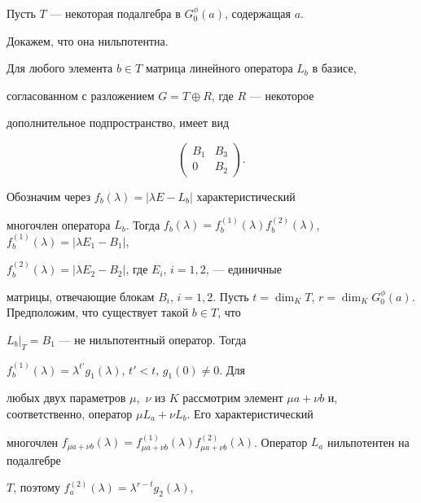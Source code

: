 \begin{pf} 


Пусть $T$ --- некоторая подалгебра в $G^\phi_0(a)$, содержащая $a$.  


Докажем, что она нильпотентна. 


 


Для любого элемента $b\in T$ матрица линейного оператора $L_b$ в базисе, 


согласованном с разложением $G=T\oplus R$, где $R$ --- некоторое 


дополнительное подпространство, имеет вид  


$$ 


\begin{pmatrix} 


B_1 & B_3 \\ 0 & B_2 


\end{pmatrix} 


. 


$$ 


 


Обозначим через $f_b(\lambda)=|\lambda E-L_b|$ характеристический 


многочлен оператора $L_b$. Тогда $f_b(\lambda)=f^{(1)}_b(\lambda) 


f^{(2)}_b(\lambda)$, $f^{(1)}_b(\lambda)=|\lambda E_1-B_1|$, 


$f^{(2)}_b(\lambda)=|\lambda E_2-B_2|$, где $E_i$, $i=1,2$, --- единичные 


матрицы, отвечающие блокам $B_i$, $i=1,2$. Пусть $t=\dim_K T$, $r=\dim_K 


G^\phi_0(a)$. Предположим, что существует такой $b\in T$, что 


$L_b|_T=B_1$ --- не нильпотентный оператор. Тогда 


$f^{(1)}_b(\lambda)=\lambda^{t'}g_1(\lambda)$, $t'<t$, $g_1(0)\ne0$. Для 


любых двух параметров $\mu$,~$\nu$ из $K$ рассмотрим элемент $\mu a+\nu 


b$ и, соответственно, оператор $\mu L_a+\nu L_b$. Его характеристический 


многочлен $f_{\mu a+\nu b}(\lambda)= f^{(1)}_{\mu a+\nu b}(\lambda) 


f^{(2)}_{\mu a+\nu b}(\lambda)$. Оператор $L_a$ нильпотентен на подалгебре 


$T$, поэтому $f^{(2)}_a(\lambda)=\lambda^{r-t}g_2(\lambda)$, 



\end{pf}
